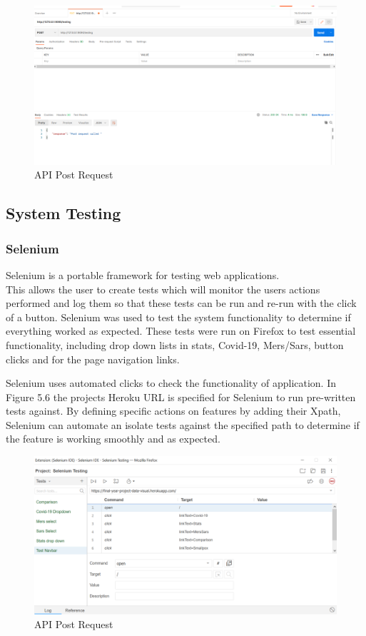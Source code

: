 \begin{figure}[H]
    \centering
    \includegraphics[scale=0.3]{img/Testpost.PNG}
    \caption{API Post Request}
    \label{fig:my_label12}
\end{figure}



\subsection{System Testing}

\subsubsection{Selenium}

Selenium is a portable framework for testing web applications.\cite{selenium}\\ This allows the user to create tests which will monitor the users actions performed and log them so that these tests can be run and re-run with the click of a button. Selenium was used to test the system functionality to determine if everything worked as expected. These tests were run on Firefox to test essential functionality, including drop down lists in stats, Covid-19, Mers/Sars, button clicks and for the page navigation links. 

Selenium uses automated clicks to check the functionality of application. In Figure 5.6 the projects Heroku URL is specified for Selenium to run pre-written tests against. By defining specific actions on features by adding their Xpath, Selenium can automate an isolate tests against the specified path to determine if the feature is working smoothly and as expected.
\begin{figure}[H]
    \centering
    \includegraphics[scale=0.4]{img/sel.PNG}
    \caption{API Post Request}
    \label{fig:my_label22}
\end{figure}



